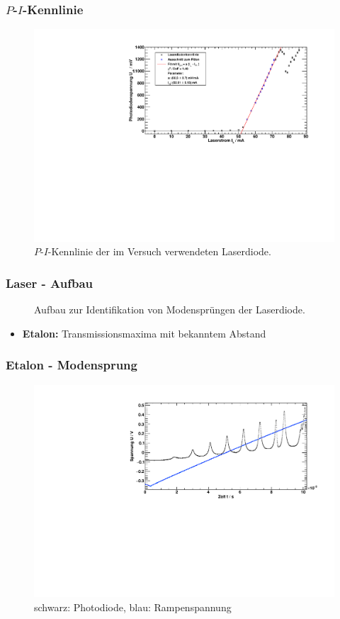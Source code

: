 \begin{frame}
\frametitle{$P$-$I$-Kennlinie}

\begin{figure}[H]
    \begin{center}
        \includegraphics[width=\textwidth]{../img/diodenkennlinie.pdf}
        \caption{$P$-$I$-Kennlinie der im Versuch verwendeten Laserdiode.}
    \end{center}
\end{figure}
\end{frame}


\begin{frame}
\frametitle{Laser - Aufbau}
\begin{figure}
    \centering
    \def\svgwidth{\textwidth}
    
    \caption{Aufbau zur Identifikation von Modensprüngen der Laserdiode.}
\end{figure}
\begin{itemize}
  \item \textbf{Etalon:} Transmissionsmaxima mit bekanntem Abstand
\end{itemize}
\end{frame}


\begin{frame}
\frametitle{Etalon - Modensprung}
\begin{figure}[H]
    \begin{center}
        \includegraphics[width=\textwidth]{../img/up-etalon_zoom.pdf}
        \caption{schwarz: Photodiode, blau: Rampenspannung}
    \end{center}
\end{figure}
\end{frame}
